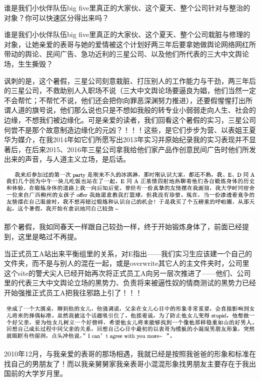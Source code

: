 \documentclass[9pt, b5paper]{article}
\begin{document}
谁是我们小伙伴队伍big five里真正的大家伙、这个夏天、整个公司针对与整治的对象？你可以快速区分得出来吗？

谁是我们小伙伴队伍big five里真正的大家伙、这个夏天、整个公司栽脏与修理的对象，让她亲爱的表哥与她的爱情被这个计划好两三年后要拿她做舆论网络网红所带动的舆论、民间广告、急功近利的三星公司、以及他们所代表的三大中文舆论场，生生撕毁？

讽刺的是，这个暑假，三星公司刻意栽脏、打压别人的工作能力与干劲，两三年后的三星公司，不救助别人入职场不说（三大中文舆论场要逼良为娼，他们当然一定不会帮忙；不帮忙不说，他们还会把你向罪恶深渊努力推进），还要假惺惺打出所谓人道的旗号说，他们那么说也只是不想如我般的转专业小弱弱走向人生、社会的边缘，不想我们被边缘化。可是亲爱的读者，我们回看这个暑假的实习，三星公司何尝不是那个故意制造边缘化的元凶？！！！这些，是它们步步为营、以表姐王夏华为媒介，在我2014年如它们所愿写出2013年实习并原始纪录我的实习表现并不显著后，在后来2015、2016年三星公司拿我给他们家产品作创意民间广告时他们所发出来的声音，与人道主义立场，是后话。 

\begin{center}
\includegraphics[width=.9\linewidth]{./pic/backups_plans_20210508_092100.png}
\end{center}

那个暑假，我如同春天一样跟自己较劲一样，终于开始锻炼身体了，前面已经提到，这里是略过不再提。

当正式员工A站出来平衡组里的关系，对E指出——我们实习生应该建一个自己的文件夹，而不是与别人的混在一起，或是overwrite其它人的主文件夹时，公司里这个site的警犬尖人已经开始再次将正式员工A向另一层次推进了——他们、公司里的代表三大中文舆论立场的黑势力、负责将来被逼性奴的情商测试的黑势力已经开始强推正式员工A把我往邪路上引了！！！

\begin{center}
\includegraphics[width=.9\linewidth]{./pic/backups_plans_20210508_095414.png}
\end{center}

2010年12月，与我亲爱的表哥的那场相遇，我就已经是按照我爸爸的形象和标准在找自己的男朋友了！而以我亲舅舅家我亲表哥小混混形象找男朋友主要存在于我出国前的大学岁月里。
\end{document}
